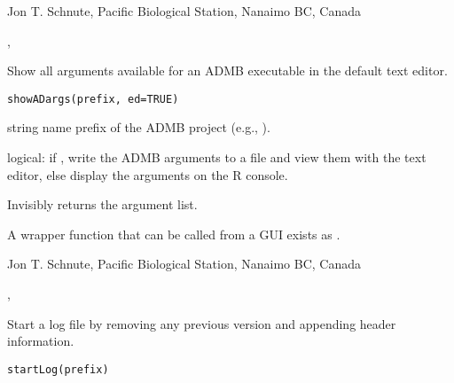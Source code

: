 \documentclass[letterpaper]{book}
\begin{document}
%
\begin{Author}\relax
 Jon T. Schnute, Pacific Biological Station, Nanaimo BC, Canada 
\end{Author}
%
\begin{SeeAlso}\relax
 ,   
\end{SeeAlso}
%
\begin{Description}\relax
Show all arguments available for an ADMB executable in the 
default text editor.
\end{Description}
%
\begin{Usage}
\begin{verbatim}
showADargs(prefix, ed=TRUE)
\end{verbatim}
\end{Usage}
%
\begin{Arguments}
\begin{ldescription}
\item[\code{prefix}] string name prefix of the ADMB project (e.g., ).
\item[\code{ed}] logical: if , write the ADMB arguments to a file and 
view them with the text editor, else display the arguments on the R console.
\end{ldescription}
\end{Arguments}
%
\begin{Value}
Invisibly returns the argument list.
\end{Value}
%
\begin{Note}\relax
A wrapper function that can be called from a GUI exists as .
\end{Note}
%
\begin{Author}\relax
 Jon T. Schnute, Pacific Biological Station, Nanaimo BC, Canada 
\end{Author}
%
\begin{SeeAlso}\relax
{}, 
\end{SeeAlso}
%
\begin{Description}\relax
Start a log file by removing any previous version and 
appending header information.
\end{Description}
%
\begin{Usage}
\begin{verbatim}
startLog(prefix)
\end{verbatim}
\end{Usage}
\end{document}
